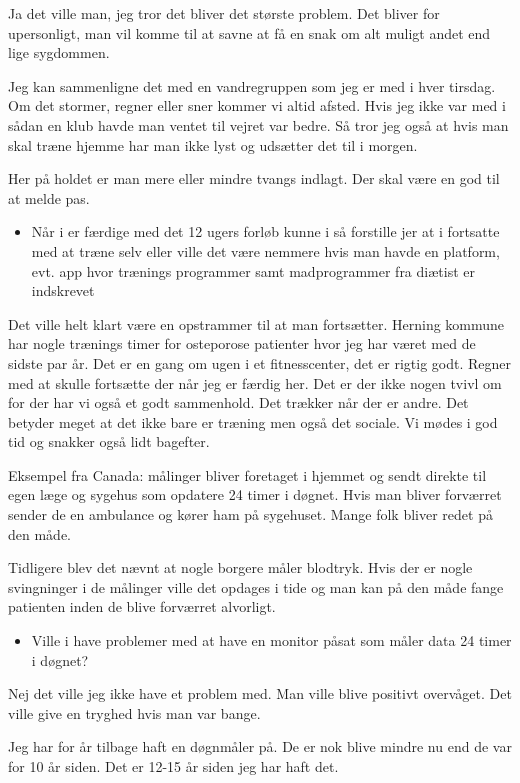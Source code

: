 Ja det ville man, jeg tror det bliver det største problem. Det bliver for upersonligt, man vil komme til at savne at få en snak om alt muligt andet end lige sygdommen. 

Jeg kan sammenligne det med en vandregruppen som jeg er med i hver tirsdag. Om det stormer, regner eller sner kommer vi altid afsted. Hvis jeg ikke var med i sådan en klub havde man ventet til vejret var bedre. Så tror jeg også at hvis man skal træne hjemme har man ikke lyst og udsætter det til i morgen. 

Her på holdet er man mere eller mindre tvangs indlagt. Der skal være en god til at melde pas. 

\begin{itemize}
	\item Når i er færdige med det 12 ugers forløb kunne i så forstille jer at i fortsatte med at træne selv eller ville det være nemmere hvis man havde en platform, evt. app hvor trænings programmer samt madprogrammer fra diætist er indskrevet
\end{itemize}
Det ville helt klart være en opstrammer til at man fortsætter. Herning kommune har nogle trænings timer for osteporose patienter hvor jeg har været med de sidste par år. Det er en gang om ugen i et fitnesscenter, det er rigtig godt. Regner med at skulle fortsætte der når jeg er færdig her. Det er der ikke nogen tvivl om for der har vi også et godt sammenhold. Det trækker når der er andre. Det betyder meget at det ikke bare er træning men også det sociale. Vi mødes i god tid og snakker også lidt bagefter. 

Eksempel fra Canada: målinger bliver foretaget i hjemmet og sendt direkte til egen læge og sygehus som opdatere 24 timer i døgnet. Hvis man bliver forværret sender de en ambulance og kører ham på sygehuset. Mange folk bliver redet på den måde. 

Tidligere blev det nævnt at nogle borgere måler blodtryk. Hvis der er nogle svingninger i de målinger ville det opdages i tide og man kan på den måde fange patienten inden de blive forværret alvorligt. 

\begin{itemize}
	\item Ville i have problemer med at have en monitor påsat som måler data 24 timer i døgnet?
\end{itemize} 
Nej det ville jeg ikke have et problem med. Man ville blive positivt overvåget. Det ville give en tryghed hvis man var bange. 

Jeg har for år tilbage haft en døgnmåler på. De er nok blive mindre nu end de var for 10 år siden. Det er 12-15 år siden jeg har haft det. 

